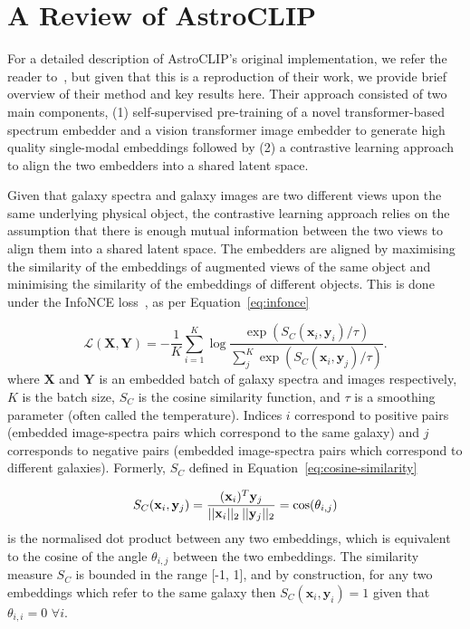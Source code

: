 
\section{A Review of AstroCLIP}\label{sec:original-paper}
For a detailed description of AstroCLIP's original implementation, we refer the reader to~\cite{astroclip}, but given that
this is a reproduction of their work, we provide brief overview of their method and key results here.
Their approach consisted of two main components, (1) self-supervised pre-training of a novel transformer-based spectrum
embedder and a vision transformer image embedder to generate high quality single-modal embeddings followed by (2) a
contrastive learning approach to align the two embedders into a shared latent space.

Given that galaxy spectra and galaxy images are two different views upon the same underlying physical object, the
contrastive learning approach relies on the assumption that there is enough mutual information between the two views
to align them into a shared latent space.
The embedders are aligned by maximising the similarity of the embeddings of augmented views of the same object and
minimising the similarity of the embeddings of different objects.
This is done under the InfoNCE loss~\citep{oord2019}, as per Equation~\eqref{eq:infonce}

\begin{equation}
\label{eq:infonce}
    \mathcal{L}(\mathbf{X}, \mathbf{Y}) = - \frac{1}{K} \sum_{i=1}^K \log \frac{\exp(S_C(\mathbf{x}_i, \mathbf{y}_i) / \tau)}{\sum_{j}^K \exp(S_C(\mathbf{x}_i, \mathbf{y}_j) / \tau)}.
\end{equation}
where $\mathbf{X}$ and $\mathbf{Y}$ is an embedded batch of galaxy spectra and images respectively, $K$ is the batch size,
$S_C$ is the cosine similarity function, and $\tau$ is a smoothing parameter (often called the temperature).
Indices $i$ correspond to positive pairs (embedded image-spectra pairs which correspond to the same galaxy) and $j$ corresponds
to negative pairs (embedded image-spectra pairs which correspond to different galaxies).
Formerly, $S_C$ defined in Equation~\eqref{eq:cosine-similarity}

\begin{equation}
\label{eq:cosine-similarity}
    S_C(\mathbf{x}_i, \mathbf{y}_j) = \frac{(\mathbf{x}_i)^{T} \mathbf{y}_j}{ ||\mathbf{x}_i||_{2} \hspace{0.2em} ||\mathbf{y}_j||_{2}}
    = \cos(\theta_{i,j})
\end{equation}
is the normalised dot product between any two embeddings, which is equivalent to the cosine of the angle $\theta_{i,j}$ between the
two embeddings.
The similarity measure $S_C$ is bounded in the range [-1, 1], and by construction, for any two embeddings which refer to
the same galaxy then $S_C(\mathbf{x}_i, \mathbf{y}_i) = 1$ given that $\theta_{i,i} = 0$ $\forall i$.

